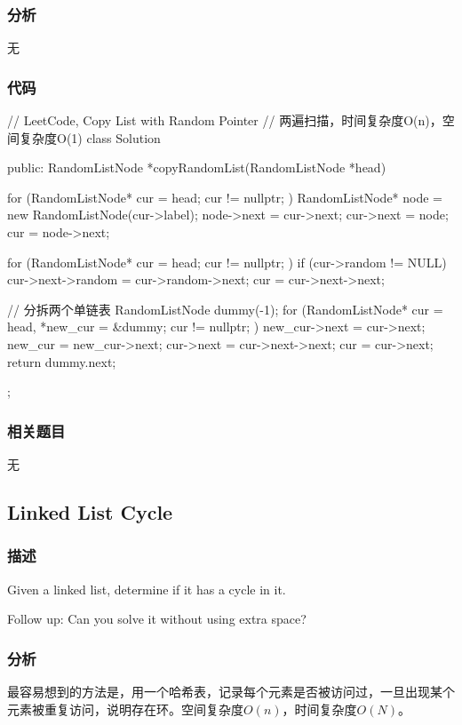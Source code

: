 \subsubsection{分析}
无


\subsubsection{代码}
\begin{Code}
// LeetCode, Copy List with Random Pointer
// 两遍扫描，时间复杂度O(n)，空间复杂度O(1)
class Solution {
public:
    RandomListNode *copyRandomList(RandomListNode *head) {
        for (RandomListNode* cur = head; cur != nullptr; ) {
            RandomListNode* node = new RandomListNode(cur->label);
            node->next = cur->next;
            cur->next = node;
            cur = node->next;
        }

        for (RandomListNode* cur = head; cur != nullptr; ) {
            if (cur->random != NULL)
                cur->next->random = cur->random->next;
            cur = cur->next->next;
        }

        // 分拆两个单链表
        RandomListNode dummy(-1);
        for (RandomListNode* cur = head, *new_cur = &dummy;
                cur != nullptr; ) {
            new_cur->next = cur->next;
            new_cur = new_cur->next;
            cur->next = cur->next->next;
            cur = cur->next;
        }
        return dummy.next;
    }
};
\end{Code}


\subsubsection{相关题目}
\begindot
\item 无
\myenddot


\subsection{Linked List Cycle}
\label{sec:Linked-List-Cycle}


\subsubsection{描述}
Given a linked list, determine if it has a cycle in it.

Follow up:
Can you solve it without using extra space?


\subsubsection{分析}
最容易想到的方法是，用一个哈希表，记录每个元素是否被访问过，一旦出现某个元素被重复访问，说明存在环。空间复杂度$O(n)$，时间复杂度$O(N)$。

